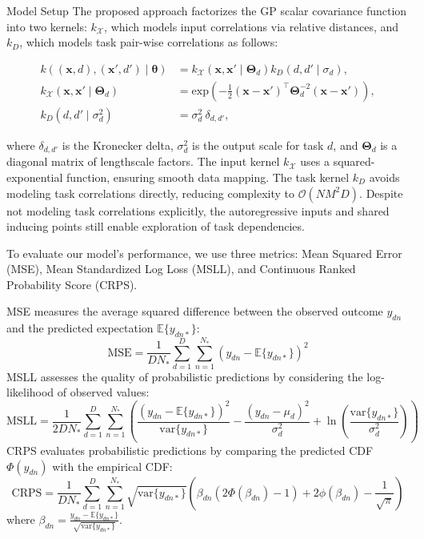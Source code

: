 \documentclass[10pt, xcolor=table]{beamer}
\begin{document}
\begin{frame}{Model Setup}
	The proposed approach factorizes the GP scalar covariance function into two kernels: $k_{\mathcal{X}}$, which models input correlations via relative distances, and $k_{D}$, which models task pair-wise correlations as follows:
	
	\begin{align}
	k\left((\bm{x}, d), (\bm{x}', d') \mid \bm{\theta}\right) &= k_{\mathcal{X}}\left(\bm{x}, \bm{x}' \mid \bm{\Theta}_d \right) k_{D}\left(d, d' \mid \sigma_d \right), \\
	k_{\mathcal{X}}\left(\bm{x}, \bm{x}' \mid \bm{\Theta}_d \right) &= \text{exp}\left(-\frac{1}{2}(\bm{x} - \bm{x}')^\top \bm{\Theta}_d^{-2} (\bm{x} - \bm{x}')\right), \\
	k_{D}\left(d, d' \mid \sigma^2_d \right) &= \sigma^2_d ~ \delta_{d, d'},
	\end{align}
	
	where $\delta_{d, d'}$ is the Kronecker delta, $\sigma^2_d$ is the output scale for task $d$, and $\bm{\Theta}_d$ is a diagonal matrix of lengthscale factors. The input kernel $k_{\mathcal{X}}$ uses a squared-exponential function, ensuring smooth data mapping. The task kernel $k_{D}$ avoids modeling task correlations directly, reducing complexity to $\mathcal{O}(N M^2 D)$. Despite not modeling task correlations explicitly, the autoregressive inputs and shared inducing points still enable exploration of task dependencies.
	
\end{frame}

\begin{frame}
	To evaluate our model's performance, we use three metrics: Mean Squared Error (MSE), Mean Standardized Log Loss (MSLL), and Continuous Ranked Probability Score (CRPS).
	
	MSE measures the average squared difference between the observed outcome $y_{dn}$ and the predicted expectation $\mathbb{E}\{y_{dn*}\}$:
	\begin{equation}\label{eq:mse}
	\text{MSE} = \frac{1}{DN_{*}} \sum_{d=1}^{D} \sum_{n=1}^{N_*} (y_{dn} - \mathbb{E}\{y_{dn*}\})^2
	\end{equation}
	MSLL assesses the quality of probabilistic predictions by considering the log-likelihood of observed values:
	\begin{equation}
	\text{MSLL} = \frac{1}{2DN_{*}} \sum_{d=1}^{D} \sum_{n=1}^{N_*} \left( \frac{(y_{dn} - \mathbb{E}\{y_{dn*}\})^2}{\text{var}\{y_{dn*}\}} - \frac{(y_{dn} - \mu_d)^2}{\sigma_d^2} + \ln \left(\frac{\text{var}\{y_{dn*}\}}{\sigma_d^2}\right) \right)
	\end{equation}
	CRPS evaluates probabilistic predictions by comparing the predicted CDF $\Phi(y_{dn})$ with the empirical CDF:
	\begin{equation}
	\text{CRPS} = \frac{1}{DN_*} \sum_{d=1}^{D} \sum_{n=1}^{N_*} \sqrt{\text{var}\{y_{dn*}\}} \left(\beta_{dn} \left( 2\Phi\left(\beta_{dn}\right) - 1 \right) + 2\phi\left(\beta_{dn}\right) - \frac{1}{\sqrt{\pi}} \right)
	\end{equation}
	where $\beta_{dn} = \frac{y_{dn} - \mathbb{E}\{y_{dn*}\}}{\sqrt{\text{var}\{y_{dn*}\}}}$.
\end{frame}
\end{document}
